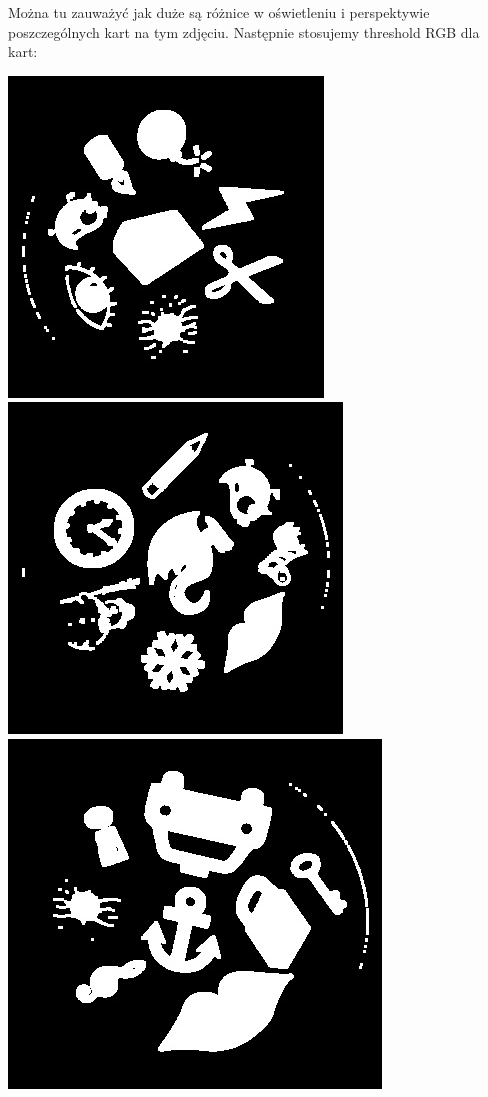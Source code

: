 \documentclass[10pt,a4paper]{article}
\begin{document}
Można tu zauważyć jak duże są różnice w oświetleniu i perspektywie poszczególnych kart na tym zdjęciu. Następnie stosujemy threshold RGB dla kart:
\begin{center}
\includegraphics[scale=0.25]{2.2/2.jpg}
\includegraphics[scale=0.25]{2.2/0.jpg}
\includegraphics[scale=0.25]{2.2/1.jpg}
\end{center}
\end{document}
